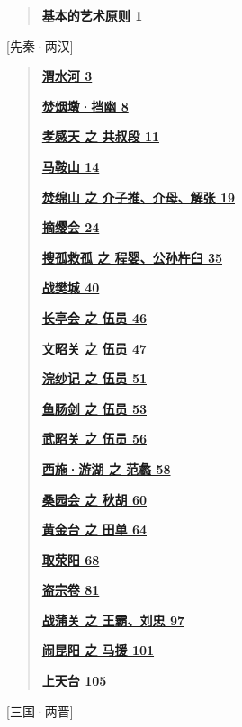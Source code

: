 \begin{quote}
\href{/l}{\textbf{基本的艺术原则 1}}
\end{quote}

{[}先秦·两汉{]}

\begin{quote}
\href{/l}{\textbf{渭水河 3}}

\href{/l}{\textbf{焚烟墩·挡幽 8}}

\href{/l}{\textbf{孝感天 之 共叔段 11}}

\href{/l}{\textbf{马鞍山 14}}

\href{/l}{\textbf{焚绵山 之 介子推、介母、解张 19}}

\href{/l}{\textbf{摘缨会 24}}

\href{/l}{\textbf{搜孤救孤 之 程婴、公孙杵臼 35}}

\href{/l}{\textbf{战樊城 40}}

\href{/l}{\textbf{长亭会 之 伍员 46}}

\href{/l}{\textbf{文昭关 之 伍员 47}}

\href{/l}{\textbf{浣纱记 之 伍员 51}}

\href{/l}{\textbf{鱼肠剑 之 伍员 53}}

\href{/l}{\textbf{武昭关 之 伍员 56}}

\href{/l}{\textbf{西施·游湖 之 范蠡 58}}

\href{/l}{\textbf{桑园会 之 秋胡 60}}

\href{/l}{\textbf{黄金台 之 田单 64}}

\href{/l}{\textbf{取荥阳 68}}

\href{/l}{\textbf{盗宗卷 81}}

\href{/l}{\textbf{战蒲关 之 王霸、刘忠 97}}

\href{/l}{\textbf{闹昆阳 之 马援 101}}

\href{/l}{\textbf{上天台 105}}
\end{quote}

{[}三国·两晋{]}


